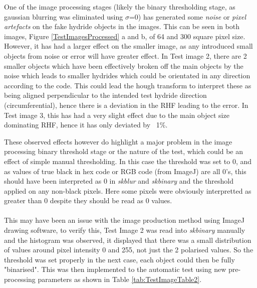 \documentclass{article}
\begin{document}
    One of the image processing stages (likely the binary thresholding stage, as gaussian blurring was eliminated using $\sigma$=0) has generated some \textit{noise} or \textit{pixel artefacts} on the fake hydride objects in the images. This can be seen in both images, Figure \ref{TestImagesProcessed} a and b, of 64 and 300 square pixel size. However, it has had a larger effect on the smaller image, as any introduced small objects from noise or error will have greater effect. In Test image 2, there are 2 smaller objects which have been effectively broken off the main objects by the noise which leads to smaller hydrides which could be orientated in any direction according to the code. This could lead the hough transform to interpret these as being aligned perpendicular to the intended test hydride direction (circumferential), hence there is a deviation in the RHF leading to the error. In Test image 3, this has had a very slight effect due to the main object size dominating RHF, hence it has only deviated by ~1\%. 

    These observed effects however do highlight a major problem in the image processing binary threshold stage or the nature of the test, which could be an effect of simple manual thresholding. In this case the threshold was set to 0, and as values of true black in hex code or RGB code (from ImageJ) are all 0's, this should have been interpreted as 0 in \textit{skblur} and \textit{skbinary} and the threshold applied on any non-black pixels. Here some pixels were obviously interpretted as greater than 0 despite they should be read as 0 values. 
    \\
    \\
    This may have been an issue with the image production method using ImageJ drawing software, to verify this, Test Image 2 was read into \textit{skbinary} manually and the histogram was observed, it displayed that there was a small distribution of values around pixel intensity 0 and 255, not just the 2 polarised values. So the threshold was set properly in the next case, each object could then be fully "binarised". This was then implemented to the automatic test using new pre-processing parameters as shown in Table \ref{tab:TestImageTable2}.
    
\end{document}
